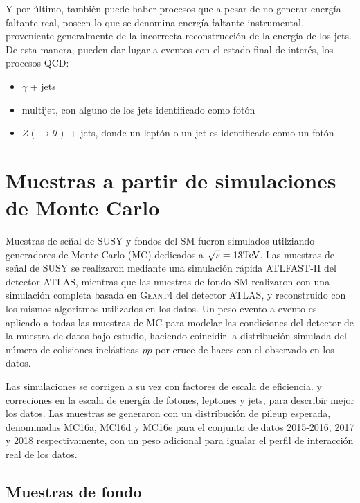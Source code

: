 Y por último, también puede haber procesos que a pesar de no generar energía faltante real, poseen lo que se denomina energía faltante instrumental, proveniente generalmente de la incorrecta reconstrucción de la energía de los jets. De esta manera, pueden dar lugar a eventos con el estado final de interés, los procesos QCD:

\begin{itemize}

	\item $\gamma$ + jets

	\item multijet, con alguno de los jets identificado como fotón

	\item $Z(\rightarrow ll)$ + jets, donde un leptón o un jet es identificado como un fotón

\end{itemize}


\section{Muestras a partir de simulaciones de Monte Carlo}

Muestras de señal de SUSY y fondos del SM fueron simulados
utilziando generadores de Monte Carlo (MC) dedicados a $\sqrt{s} = 13 \text{TeV}$.
Las muestras de señal de SUSY se realizaron mediante una simulación rápida \textsc{ATLFAST-II} \cite{Richter-Was:683751} del detector ATLAS, mientras que las muestras de fondo SM realizaron con una simulación completa basada en \textsc{Geant4}\cite{Geant4} del detector ATLAS, y reconstruido con los mismos
algoritmos utilizados en los datos. Un peso evento a evento es aplicado
a todas las muestras de MC para modelar las condiciones del detector de la muestra de datos bajo estudio,
haciendo coincidir la distribución simulada del número de colisiones inelásticas $pp$ por cruce de haces con el observado en los datos.

Las simulaciones se corrigen a su vez con factores de escala de eficiencia.
y correciones en la escala de energía de fotones, leptones y
jets, para describir mejor los datos. Las muestras se generaron con un
distribución de pileup esperada, denominadas MC16a, MC16d y MC16e para el conjunto de datos 2015-2016, 2017 y
2018 respectivamente, con un peso adicional para igualar
el perfil de interacción real de los datos. 


\subsection{Muestras de fondo}


